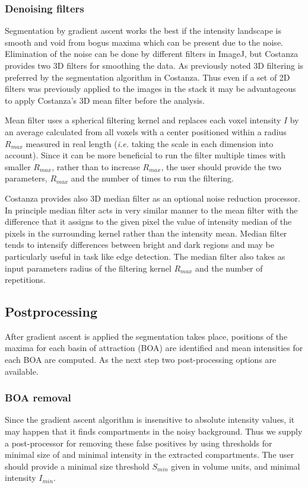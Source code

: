 \documentclass[a4paper,12pt]{article}
\begin{document}
\subsubsection{Denoising filters}
Segmentation by gradient ascent works the best if the intensity landscape is
smooth and void from bogus maxima which can be present due to the
noise. Elimination of the noise can be done by different filters in ImageJ,
but Costanza provides two 3D filters for smoothing the data. As previously
noted 3D filtering is preferred by the segmentation algorithm in
Costanza. Thus even if a set of 2D filters was previously applied to the
images in the stack it may be advantageous to apply Costanza's 3D mean filter
before the analysis.

Mean filter uses a spherical filtering kernel and replaces each voxel
intensity $I$ by an average calculated from all voxels with a center
positioned within a radius $R_{max}$ measured in real length (\textit{i.e.}
taking the scale in each dimension into account). Since it can be more
beneficial to run the filter multiple times with smaller $R_{max}$, rather
than to increase $R_{max}$, the user should provide the two parameters,
$R_{max}$ and the number of times to run the filtering.

Costanza provides also 3D median filter as an optional noise reduction
processor. In principle median filter acts in very similar manner to the mean
filter with the difference that it assigns to the given pixel the value of
intensity median of the pixels in the surrounding kernel rather than the
intensity mean. Median filter tends to intensify differences between bright
and dark regions and may be particularly useful in task like edge
detection. The median filter also takes as input parameters radius of the
filtering kernel $R_{max}$ and the number of repetitions.

\subsection{Postprocessing}
After gradient ascent is applied the segmentation takes place, positions of
the maxima for each basin of attraction (BOA) are identified and mean
intensities for each BOA are computed. As the next step two post-processing
options are available.

\subsubsection{BOA removal}
Since the gradient ascent algorithm is insensitive to absolute intensity
values, it may happen that it finds compartments in the noisy
background. Thus we supply a post-processor for removing these false positives by
using thresholds for minimal size of and minimal intensity in the extracted
compartments. The user should provide a minimal size threshold $S_{min}$ given in volume
units, and minimal intensity $I_{min}$.
\end{document}

